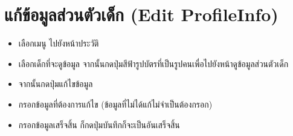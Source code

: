 \section{แก้ข้อมูลส่วนตัวเด็ก (Edit ProfileInfo)}
\begin{itemize}
    \item เลือกเมนู ไปยังหน้าประวัติ
    \item เลือกเด็กที่จะดูข้อมูล จากนั้นกดปุ่มสีฟ้ารูปบัตรที่เป็นรูปคนเพื่อไปยังหน้าดูข้อมูลส่วนตัวเด็ก
    \item จากนั้นกดปุ่มแก้ไขข้อมูล
    \item กรอกข้อมูลที่ต้องการแก้ไข (ข้อมูลที่ไม่ได้แก้ไม่จำเป็นต้องกรอก)
    \item กรอกข้อมูลเสร็จสิ้น ก็กดปุ่มบันทึกก็จะเป็นอันเสร็จสิ้น
\end{itemize}
